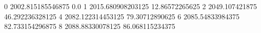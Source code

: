 0 2002.815185546875 0.0
1 2015.680908203125 12.86572265625
2 2049.107421875 46.292236328125
4 2082.122314453125 79.30712890625
6 2085.54833984375 82.733154296875
8 2088.88330078125 86.068115234375
